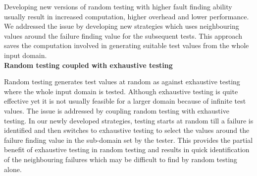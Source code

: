 Developing new versions of random testing with higher fault finding ability usually result in increased computation, higher overhead and lower performance. We addressed the issue by developing new strategies which uses neighbouring values around the failure finding value for the subsequent tests. This approach saves the computation involved in generating suitable test values from the whole input domain. \\

\textbf{Random testing coupled with exhaustive testing}

Random testing generates test values at random as against exhaustive testing where the whole input domain is tested. Although exhaustive testing is quite effective yet it is not usually feasible for a larger domain because of infinite test values. The issue is addressed by coupling random testing with exhaustive testing. In our newly developed strategies, testing starts at random till a failure is identified and then switches to exhaustive testing to select the values around the failure finding value in the sub-domain set by the tester. This provides the partial benefit of exhaustive testing in random testing and results in quick identification of the neighbouring failures which may be difficult to find by random testing alone.\\







